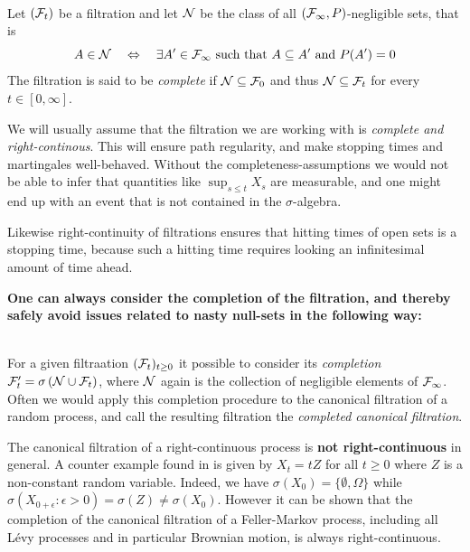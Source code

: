 \begin{definition}\label{chap3.1:definition-completeness_filtration}
 \\
Let $(\mathcal{F}_t)$ be a filtration and let $\mathcal{N}$ be the class of all $(\mathcal{F}_\infty,P)$-negligible sets, that is
$$A \in \mathcal{N} \quad \Leftrightarrow \quad \exists A' \in \mathcal{F}_\infty \text{ such that } A \subseteq A' \text{ and } P(A')=0$$
The filtration is said to be \textit{complete} if $\mathcal{N} \subseteq \mathcal{F}_0$ and thus $\mathcal{N} \subseteq \mathcal{F}_t$ for every $t \in [0,\infty]$.
\end{definition}
We will usually assume that the filtration we are working with is \textit{complete and right-continous}. This will ensure path regularity, and make stopping times and martingales well-behaved.
Without the completeness-assumptions we would not be able to infer that quantities like $\sup_{s \leq t}X_s$ are measurable, and one might end up with an event that is not contained in the $\sigma$-algebra.

Likewise right-continuity of filtrations ensures that hitting times of open sets is a stopping time, because such a hitting time requires looking an infinitesimal amount of time ahead. 

\textbf{One can always consider the completion of the filtration, and thereby safely avoid issues related to nasty null-sets in the following way:}
\begin{remark} \label{chap3.1:remark-completing_a_non_complete_filtration}
 \\
For a given filtraation $(\mathcal{F}_t)_{t \geq 0}$ it possible to consider its \textit{completion} $\mathcal{F}'_t=\sigma\left(\mathcal{N} \cup \mathcal{F}_t\right)$, where $\mathcal{N}$ again is the collection of negligible elements of $\mathcal{F}_\infty$. Often we would apply this completion procedure to the canonical filtration of a random process, and call the resulting filtration the \textit{completed canonical filtration}.
\end{remark}

\begin{trap}\label{chap3.1:trap-right_continous_process_does_not_imply_right_continous_filtration}
The canonical filtration of a right-continuous process is \textbf{not right-continuous} in general. A counter example found in \cite{chafai2021completeness} is given by $X_t=tZ$ for all $t \geq 0$ where $Z$ is a non-constant random variable. Indeed, we have $\sigma(X_0)=\{\emptyset, \Omega\}$ while $\sigma(X_{0+\epsilon}: \epsilon > 0) = \sigma(Z) \neq \sigma(X_0)$. However it can be shown that the completion of the canonical filtration of a Feller-Markov process, including all Lévy processes and in particular Brownian motion, is always right-continuous.
\end{trap}


